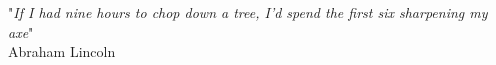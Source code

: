 \begin{center}
	"\emph{If I had nine hours to chop down a tree, I’d spend the first six sharpening my axe}"\\
	Abraham Lincoln
\end{center}
